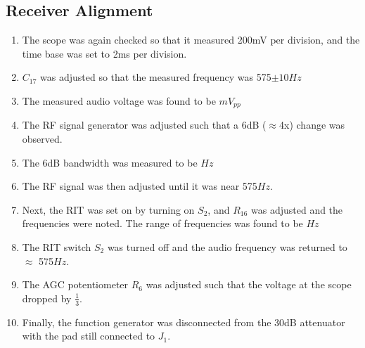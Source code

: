 \documentclass{./cls/hw}
\begin{document}
\subsection{Receiver Alignment}
\begin{enumerate}
  \item The scope was again checked so that it measured 200mV per division,
    and the time base was set to 2ms per division.
  \item $C_{17}$ was adjusted so that the measured frequency was 575$\pm 10Hz$
  \item The measured audio voltage was found to be $\boxed{ mV_{pp}}$
  \item The RF signal generator was adjusted such that a 6dB ($\approx$4x) change was observed.
  \item The 6dB bandwidth was measured to be $\boxed{ Hz}$
  \item The RF signal was then adjusted until it was near 575$Hz$.
  \item Next, the RIT was set on by turning on $S_2$, and $R_16$ was adjusted
    and the frequencies were noted. The range of frequencies was found to be
    $\boxed{ Hz}$
  \item The RIT switch $S_2$ was turned off and the audio frequency was
    returned to $\approx$ 575$Hz$.
  \item The AGC potentiometer $R_6$ was adjusted such that the voltage at the
    scope dropped by $\frac{1}{3}$.
  \item Finally, the function generator was disconnected from the 30dB
    attenuator with the pad still connected to $J_1$.
\end{enumerate}
\end{document}
